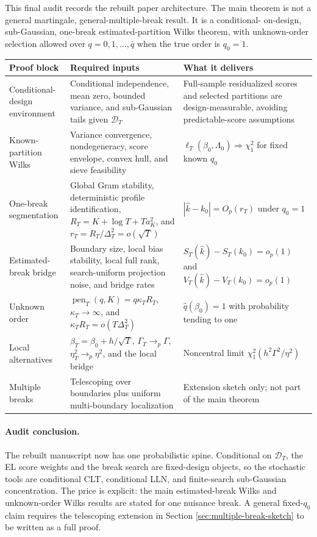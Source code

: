 \documentclass[12pt]{article}
\numberwithin{equation}{section}
\theoremstyle{definition}
\newcommand{\D}{\mathcal D}
\begin{document}
This final audit records the rebuilt paper architecture.  The main theorem is
not a general martingale, general-multiple-break result.  It is a conditional-
on-design, sub-Gaussian, one-break estimated-partition Wilks theorem, with
unknown-order selection allowed over \(q=0,1,\ldots,\bar q\) when the true order
is \(q_0=1\).

\begin{center}
\small
\begin{tabular}{>{\raggedright\arraybackslash}p{}
                >{\raggedright\arraybackslash}p{}
                >{\raggedright\arraybackslash}p{}}
\hline
Proof block & Required inputs & What it delivers \\
\hline
Conditional-design environment & Conditional independence, mean zero, bounded variance, and sub-Gaussian tails given \(\D_T\) & Full-sample residualized scores and selected partitions are design-measurable, avoiding predictable-score assumptions \\
Known-partition Wilks & Variance convergence, nondegeneracy, score envelope, convex hull, and sieve feasibility & \(\ell_T(\beta_0,\Lambda_0)\Rightarrow\chi_1^2\) for fixed known \(q_0\) \\
One-break segmentation & Global Gram stability, deterministic profile identification, \(R_T=K+\log T+Ta_K^2\), and \(r_T=R_T/\Delta_T^2=o(\sqrt T)\) & \(|\widehat k-k_0|=O_p(r_T)\) under \(q_0=1\) \\
Estimated-break bridge & Boundary size, local bias stability, local full rank, search-uniform projection noise, and bridge rates & \(S_T(\widehat k)-S_T(k_0)=o_p(1)\) and \(V_T(\widehat k)-V_T(k_0)=o_p(1)\) \\
Unknown order & \(\operatorname{pen}_T(q,K)=q\kappa_TR_T\), \(\kappa_T\to\infty\), and \(\kappa_TR_T=o(T\Delta_T^2)\) & \(\widehat q(\beta_0)=1\) with probability tending to one \\
Local alternatives & \(\beta_T=\beta_0+h/\sqrt T\), \(\Gamma_T\to_p\Gamma\), \(\eta_T^2\to_p\eta^2\), and the local bridge & Noncentral limit \(\chi_1^2(h^2\Gamma^2/\eta^2)\) \\
Multiple breaks & Telescoping over boundaries plus uniform multi-boundary localization & Extension sketch only; not part of the main theorem \\
\hline
\end{tabular}
\end{center}

\paragraph{Audit conclusion.}
The rebuilt manuscript now has one probabilistic spine.  Conditional on
\(\D_T\), the EL score weights and the break search are fixed-design objects,
so the stochastic tools are conditional CLT, conditional LLN, and finite-search
sub-Gaussian concentration.  The price is explicit: the main estimated-break
Wilks and unknown-order Wilks results are stated for one nuisance break.  A
general fixed-\(q_0\) claim requires the telescoping extension in Section
\ref{sec:multiple-break-sketch} to be written as a full proof.
\end{document}
